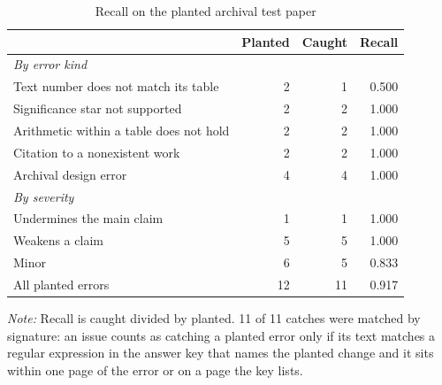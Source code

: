 \begin{table}[htbp]
\centering
\caption{Recall on the planted archival test paper}
\label{tab:recall_planted}
\begin{threeparttable}
\begin{tabular}{lrrr}
\toprule
 & Planted & Caught & Recall \\
\midrule
\multicolumn{4}{l}{\textit{By error kind}} \\
Text number does not match its table & 2 & 1 & 0.500 \\
Significance star not supported & 2 & 2 & 1.000 \\
Arithmetic within a table does not hold & 2 & 2 & 1.000 \\
Citation to a nonexistent work & 2 & 2 & 1.000 \\
Archival design error & 4 & 4 & 1.000 \\
\midrule
\multicolumn{4}{l}{\textit{By severity}} \\
Undermines the main claim & 1 & 1 & 1.000 \\
Weakens a claim & 5 & 5 & 1.000 \\
Minor & 6 & 5 & 0.833 \\
\midrule
All planted errors & 12 & 11 & 0.917 \\
\bottomrule
\end{tabular}
\begin{tablenotes}[flushleft]
\footnotesize
\item \textit{Note:} Recall is caught divided by planted. 11 of 11 catches were matched by signature: an issue counts as catching a planted error only if its text matches a regular expression in the answer key that names the planted change and it sits within one page of the error or on a page the key lists.
\end{tablenotes}
\end{threeparttable}
\end{table}
